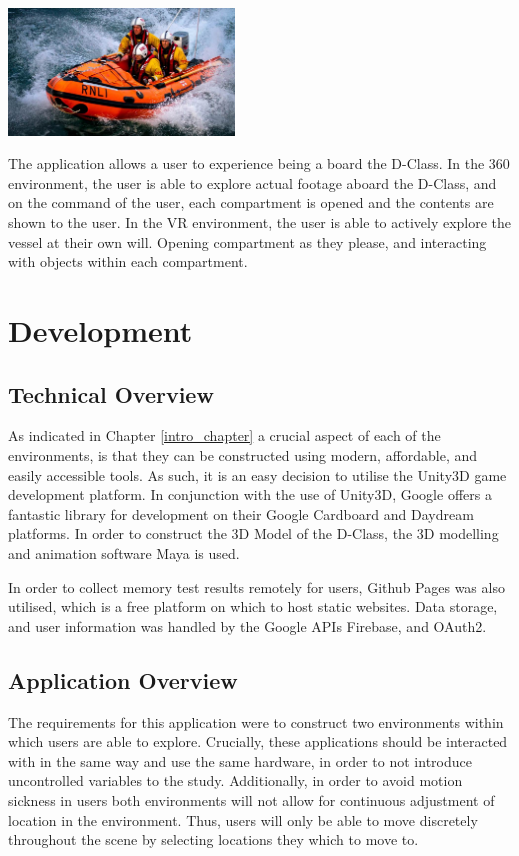 \documentclass[a4paper, openright, twoside]{report}
\begin{document}
\begin{center}
\hfill \break
\includegraphics[width=0.45\textwidth]{images/d-class}
\label{dclass}
\hfill \break
\end{center}

The application allows a user to experience being a board the D-Class. In the 360 environment, the user is able to explore actual footage aboard the D-Class, and on the command of the user, each compartment is opened and the contents are shown to the user. In the VR environment, the user is able to actively explore the vessel at their own will. Opening compartment as they please, and interacting with objects within each compartment. 

\chapter{Development}

\section{Technical Overview}
As indicated in Chapter \ref{intro_chapter} a crucial aspect of each of the environments, is that they can be constructed using modern, affordable, and easily accessible tools. As such, it is an easy decision to utilise the Unity3D game development platform. In conjunction with the use of Unity3D, Google offers a fantastic library for development on their Google Cardboard and Daydream platforms. In order to construct the 3D Model of the D-Class, the 3D modelling and animation software Maya is used. 

In order to collect memory test results remotely for users, Github Pages was also utilised, which is a free platform on which to host static websites. Data storage, and user information was handled by the Google APIs Firebase, and OAuth2.

\section{Application Overview}
The requirements for this application were to construct two environments within which users are able to explore. Crucially, these applications should be interacted with in the same way and use the same hardware, in order to not introduce uncontrolled variables to the study. Additionally, in order to avoid motion sickness in users both environments will not allow for continuous adjustment of location in the environment. Thus, users will only be able to move discretely throughout the scene by selecting locations they which to move to. 
\end{document}
